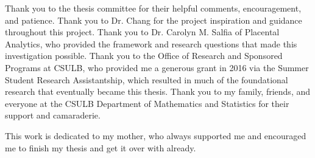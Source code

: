 
Thank you to the thesis committee for their helpful comments, encouragement, and patience.
Thank you to Dr. Chang for the project inspiration and guidance throughout this project.
Thank you to Dr. Carolyn M. Salfia of Placental Analytics, who provided the framework and research questions that made this investigation possible.
Thank you to the Office of Research and Sponsored Programs at CSULB, who provided me a generous grant in 2016 via the Summer Student Research Assistantship, which resulted in much of the foundational research that eventually became this thesis.
Thank you to my family, friends, and everyone at the CSULB Department of Mathematics and Statistics for their support and camaraderie.


This work is dedicated to my mother, who always supported me and encouraged me to finish my thesis and get it over with already.